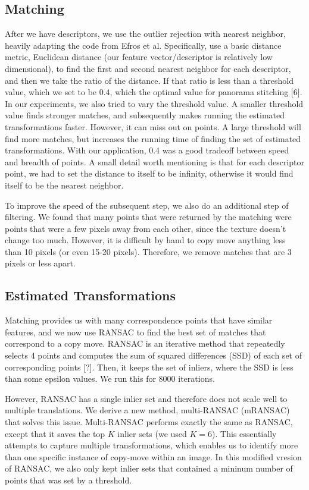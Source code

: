 \documentclass[12pt]{article}
\begin{document}
\subsection*{Matching}
After we have descriptors, we use the outlier rejection with nearest neighbor, heavily adapting the code from Efros et al.  Specifically, use a basic distance metric, Euclidean distance (our feature vector/descriptor is relatively low dimensional), to find the first and second nearest neighbor for each descriptor, and then we take the ratio of the distance. If that ratio is less than a threshold value, which we set to be 0.4, which the optimal value for panorama stitching [6]. In our experiments, we also tried to vary the threshold value. A smaller threshold value finds stronger matches, and subsequently makes running the estimated transformations faster. However, it can miss out on points. A large threshold will find more matches, but increases the running time of finding the set of estimated transformations. With our application, 0.4 was a good tradeoff between speed and breadth of points. A small detail worth mentioning is that for each descriptor point, we had to set the distance to itself to be infinity, otherwise it would find itself to be the nearest neighbor. 

To improve the speed of the subsequent step, we also do an additional step of filtering. We found that many points that were returned by the matching were points that were a few pixels away from each other, since the texture doesn't change too much. However, it is difficult by hand to copy move anything less than 10 pixels (or even 15-20 pixels). Therefore, we remove matches that are 3 pixels or less apart. 

\subsection*{Estimated Transformations}
Matching provides us with many correspondence points that have similar features, and we now use RANSAC to find the best set of matches that correspond to a copy move. RANSAC is an iterative method that repeatedly selects 4 points and computes the sum of squared differences (SSD) of each set of corresponding points [?]. Then, it keeps the set of inliers, where the SSD is less than some epsilon values. We run this for 8000 iterations. 

However, RANSAC has a single inlier set and therefore does not scale well to multiple translations. We derive a new method, multi-RANSAC (mRANSAC) that solves this issue. Multi-RANSAC performs exactly the same as RANSAC, except that it saves the top $K$ inlier sets (we used $K = 6$). This essentially attempts to capture multiple transformations, which enables us to identify more than one specific instance of copy-move within an image. In this modified vresion of RANSAC, we also only kept inlier sets that contained a mininum number of points that was set by a threshold.
\end{document}
